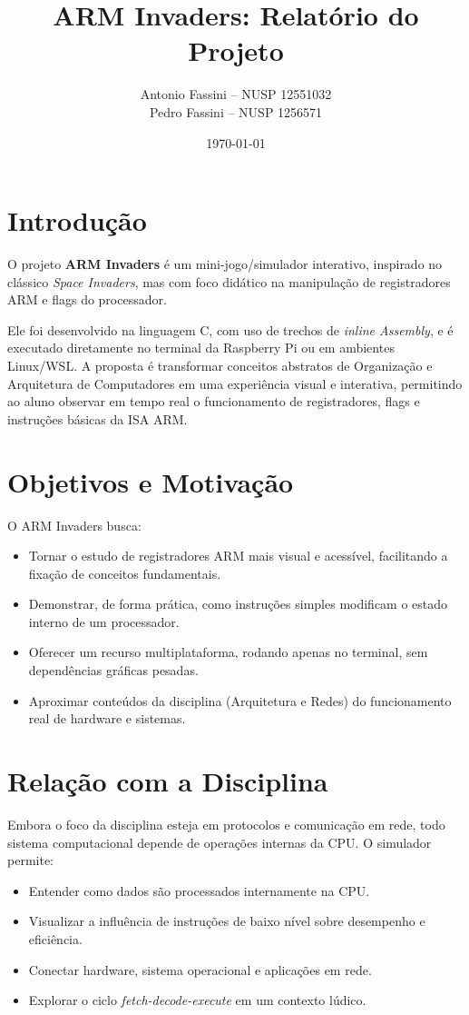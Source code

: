 \documentclass[12pt,a4paper]{report}
\title{ARM Invaders: Relatório do Projeto}
\author{Antonio Fassini -- NUSP 12551032 \\ Pedro Fassini -- NUSP 1256571}
\date{\today}
\begin{document}
\maketitle
\tableofcontents
\onehalfspacing

\chapter{Introdução}
O projeto \textbf{ARM Invaders} é um mini-jogo/simulador interativo, inspirado no clássico \textit{Space Invaders}, mas com foco didático na manipulação de registradores ARM e flags do processador.  

Ele foi desenvolvido na linguagem C, com uso de trechos de \textit{inline Assembly}, e é executado diretamente no terminal da Raspberry Pi ou em ambientes Linux/WSL.  
A proposta é transformar conceitos abstratos de Organização e Arquitetura de Computadores em uma experiência visual e interativa, permitindo ao aluno observar em tempo real o funcionamento de registradores, flags e instruções básicas da ISA ARM.

\chapter{Objetivos e Motivação}
O ARM Invaders busca:
\begin{itemize}
    \item Tornar o estudo de registradores ARM mais visual e acessível, facilitando a fixação de conceitos fundamentais.
    \item Demonstrar, de forma prática, como instruções simples modificam o estado interno de um processador.
    \item Oferecer um recurso multiplataforma, rodando apenas no terminal, sem dependências gráficas pesadas.
    \item Aproximar conteúdos da disciplina (Arquitetura e Redes) do funcionamento real de hardware e sistemas.
\end{itemize}

\chapter{Relação com a Disciplina}
Embora o foco da disciplina esteja em protocolos e comunicação em rede, todo sistema computacional depende de operações internas da CPU.  
O simulador permite:
\begin{itemize}
    \item Entender como dados são processados internamente na CPU.
    \item Visualizar a influência de instruções de baixo nível sobre desempenho e eficiência.
    \item Conectar hardware, sistema operacional e aplicações em rede.
    \item Explorar o ciclo \textit{fetch-decode-execute} em um contexto lúdico.
\end{itemize}
\end{document}
